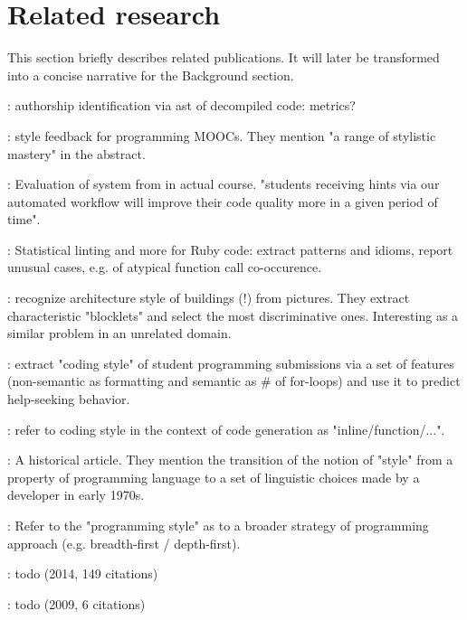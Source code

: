 \section{Related research}
This section briefly describes related publications. It will later be transformed into a concise narrative for the Background section.

\cite{caliskan2015coding}: authorship identification via ast of decompiled code: metrics?

\cite{moghadam2015autostyle}: style feedback for programming MOOCs. They mention "a range of stylistic mastery" in the abstract.

\cite{choudhury2016scale}: Evaluation of system from \cite{moghadam2015autostyle} in actual course. "students receiving hints via our automated workflow will improve their code quality more in a given period of time".

\cite{fast2014emergent}: Statistical linting and more for Ruby code: extract patterns and idioms, report unusual cases, e.g. of atypical function call co-occurence.

\cite{zhang2014recognizing}: recognize architecture style of buildings (!) from pictures. They extract characteristic "blocklets" and select the most discriminative ones. Interesting as a similar problem in an unrelated domain.

\cite{bumbacher2013student}: extract "coding style" of student programming submissions via a set of features (non-semantic as formatting and semantic as \# of for-loops) and use it to predict help-seeking behavior.

\cite{sung2000memory}: refer to coding style in the context of code generation as "inline/function/...".



\cite{priestley2017ai}: A historical article. They mention the transition of the notion of "style" from a property of programming language to a set of linguistic choices made by a developer in early 1970s.

\cite{karimi2016links}: Refer to the "programming style" as to a broader strategy of programming approach (e.g. breadth-first / depth-first).

\cite{allamanis2014learning}: todo (2014, 149 citations)

\cite{cox2009programming}: todo (2009, 6 citations)

